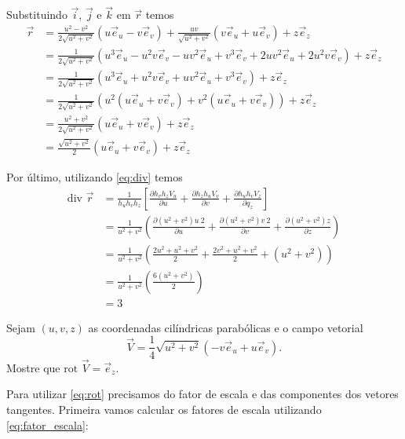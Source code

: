 \documentclass[a4paper,12pt, leqno, answers]{exam}
\newcommand{\devp}[2]{\frac{\partial #1}{\partial #2}}
\newcommand{\diver}{\mbox{div }}
\newcommand{\rot}{\mbox{rot }}
\begin{document}
\begin{questions}
\begin{solution}
        Substituindo $\vec{i}$, $\vec{j}$ e $\vec{k}$ em $\vec{r}$ temos
        \begin{align*}
            \vec{r} &= \frac{u^2 - v^2}{2 \sqrt{u^2 + v^2}} \left( u \vec{e}_u - v \vec{e}_v \right) + \frac{u v}{\sqrt{u^2 + v^2}} \left( v \vec{e}_u + u \vec{e}_v \right) + z \vec{e}_z \\
            &= \frac{1}{2 \sqrt{u^2 + v^2}} \left( u^3 \vec{e}_u - u^2 v \vec{e}_v - u v^2 \vec{e}_u + v^3 \vec{e}_v + 2 u v^2 \vec{e}_u + 2 u^2 v \vec{e}_v \right) + z \vec{e}_z \\
            &= \frac{1}{2 \sqrt{u^2 + v^2}} \left( u^3 \vec{e}_u + u^2 v \vec{e}_v + u v^2 \vec{e}_u + v^3 \vec{e}_v \right) + z \vec{e}_z \\
            &= \frac{1}{2 \sqrt{u^2 + v^2}} \left( u^2 \left( u \vec{e}_u + v \vec{e}_v \right) + v^2 \left( u \vec{e}_u + v \vec{e}_v \right) \right) + z \vec{e}_z \\
            &= \frac{u^2 + v^2}{2 \sqrt{u^2 + v^2}} \left( u \vec{e}_u + v \vec{e}_v \right) + z \vec{e}_z \\
            &= \frac{\sqrt{u^2 + v^2}}{2} \left( u \vec{e}_u + v \vec{e}_v \right) + z \vec{e}_z
        \end{align*}
        
        Por \'{u}ltimo, utilizando \eqref{eq:div} temos
        \begin{align*}
            \diver \vec{r} &= \frac{1}{h_u h_v h_z} \left[\devp{h_v h_z V_u}{u} + \devp{h_z h_u V_v}{v} + \devp{h_u h_v V_z}{q_z}\right] \\
            &= \frac{1}{u^2 + v^2} \left( \devp{\left( u^2 + v^2 \right) u \ 2}{u} + \devp{\left( u^2 + v^2 \right) v \ 2}{v} + \devp{\left( u^2 + v^2 \right) z}{z} \right) \\
            &= \frac{1}{u^2 + v^2} \left( \frac{2 u^2 + u^2 + v^2}{2} + \frac{2 v^2 + u^2 + v^2}{2} + \left( u^2 + v^2 \right) \right) \\
            &= \frac{1}{u^2 + v^2} \left( \frac{6 \left( u^2 + v^2 \right)}{2} \right) \\
            &= 3
        \end{align*}
    \end{solution}
  
    \question Sejam $(u, v, z)$ as coordenadas cil\'{i}ndricas parab\'{o}licas e o campo vetorial
    \[
    \vec{V} = \frac{1}{4} \sqrt{u^2 + v^2} (-v \vec{e}_u + u \vec{e}_v).
    \]
    Mostre que $\rot \vec{V} = \vec{e}_z$.
    \begin{solution}
        Para utilizar \eqref{eq:rot} precisamos do fator de escala e das componentes dos vetores tangentes. Primeira vamos calcular os fatores de escala utilizando \eqref{eq:fator_escala}:


\end{solution}
\end{questions}
\end{document}
